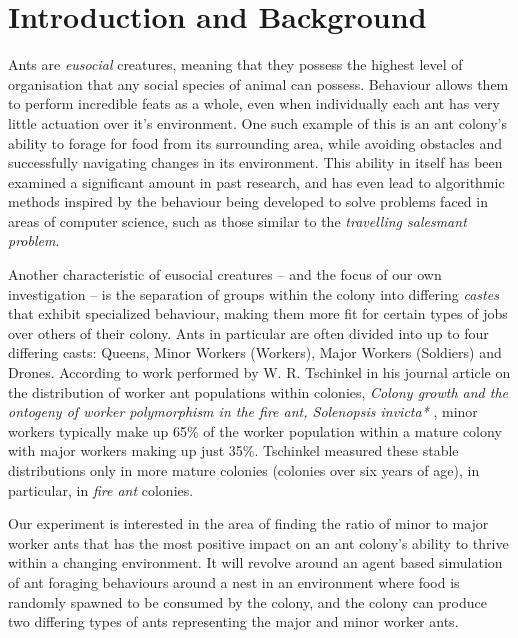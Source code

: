 \section{Introduction and Background}
		
    Ants are \textit{eusocial} creatures, meaning that they possess the highest level of organisation that any social species of animal can possess\cite{wilson_insect_1971, hadley_what_nodate}. Behaviour allows them to perform
    incredible feats as a whole, even when individually each ant has very little actuation over it's environment. One such example of this is an ant colony's ability to forage for food from its surrounding area, while avoiding
    obstacles and successfully navigating changes in its environment. This ability in itself has been examined a significant amount in past research\cite{vittori_modeling_2004, a_panait_ant_2004}, and has even lead to algorithmic
    methods inspired by the behaviour being developed to solve problems faced in areas of computer science, such as those similar to the \textit{travelling salesmant problem}\cite{dorigo_ant_2006, zhang_improved_2007}.

    Another characteristic of eusocial creatures -- and the focus of our own investigation -- is the separation of groups within the colony into differing \textit{castes} that exhibit specialized behaviour, making them more fit
    for certain types of jobs over others of their colony\cite{hadley_what_nodate}. Ants in particular are often divided into up to four differing casts: Queens, Minor Workers (Workers), Major Workers (Soldiers) and Drones\cite{noauthor_ant_nodate,noauthor_castes_nodate}.
    According to work performed by W. R. Tschinkel in his journal article on the distribution of worker ant populations within colonies, \textit{Colony growth and the ontogeny of worker polymorphism in the fire ant, Solenopsis invicta*} \cite{Tschinkel1988}, minor workers typically make up 65\% of the worker population within a mature colony with major workers making up just 35\%. Tschinkel measured these stable distributions only in more mature
    colonies (colonies over six years of age), in particular, in \textit{fire ant} colonies.

    Our experiment is interested in the area of finding the ratio of minor to major worker ants that has the most positive impact on an ant colony's ability to thrive within a changing environment. It will
    revolve around an agent based simulation of ant foraging behaviours around a nest in an environment where food is randomly spawned to be consumed by the colony, and the colony can produce two differing types of ants
    representing the major and minor worker ants.

